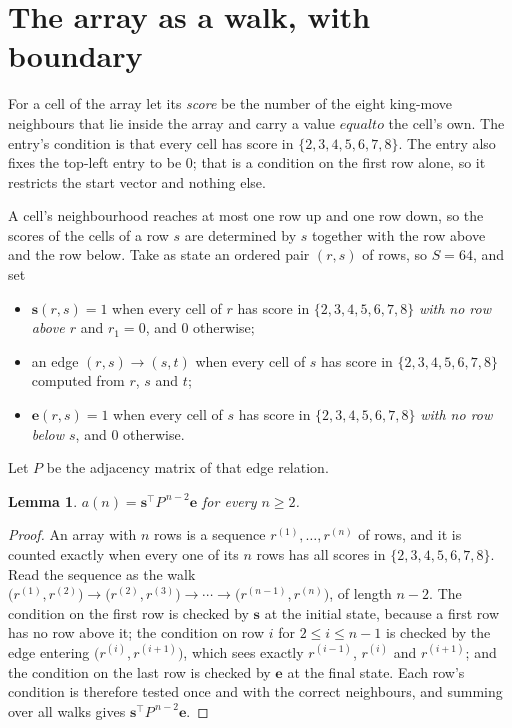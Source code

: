 \documentclass[11pt,a4paper]{article}
\theoremstyle{plain}
\newtheorem{lemma}[theorem]{Lemma}
\theoremstyle{definition}
\begin{document}
\section{The array as a walk, with boundary}

For a cell of the array let its \emph{score} be the number of the eight king-move neighbours that lie inside
the array and carry a value $equal to$ the cell's own. The entry's condition is that every cell
has score in $\{2,3,4,5,6,7,8\}$. The entry also fixes the top-left entry to be $0$; that is a condition on the first row alone, so it restricts the start vector and nothing else.

A cell's neighbourhood reaches at most one row up and one row down, so the scores of the
cells of a row $s$ are determined by $s$ together with the row above and the row below.
Take as state an ordered pair $(r,s)$ of rows, so $S=64$, and set
\begin{itemize}
\item $\mathbf{s}(r,s)=1$ when every cell of $r$ has score in $\{2,3,4,5,6,7,8\}$ \emph{with no row
above $r$} and $r_1=0$, and $0$ otherwise;
\item an edge $(r,s)\to(s,t)$ when every cell of $s$ has score in $\{2,3,4,5,6,7,8\}$ computed from
$r$, $s$ and $t$;
\item $\mathbf{e}(r,s)=1$ when every cell of $s$ has score in $\{2,3,4,5,6,7,8\}$ \emph{with no row
below $s$}, and $0$ otherwise.
\end{itemize}
Let $P$ be the adjacency matrix of that edge relation.

\begin{lemma}\label{lem:walk}
$a(n)=\mathbf{s}^{\!\top}P^{\,n-2}\mathbf{e}$ for every $n\ge2$.
\end{lemma}

\begin{proof}
An array with $n$ rows is a sequence $r^{(1)},\dots,r^{(n)}$ of rows, and it is counted
exactly when every one of its $n$ rows has all scores in $\{2,3,4,5,6,7,8\}$. Read the sequence as the
walk $\bigl(r^{(1)},r^{(2)}\bigr)\to\bigl(r^{(2)},r^{(3)}\bigr)\to\cdots\to
\bigl(r^{(n-1)},r^{(n)}\bigr)$, of length $n-2$. The condition on the first row is
checked by $\mathbf{s}$ at the initial state, because a first row has no row above it; the
condition on row $i$ for $2\le i\le n-1$ is checked by the edge entering
$\bigl(r^{(i)},r^{(i+1)}\bigr)$, which sees exactly $r^{(i-1)}$, $r^{(i)}$ and
$r^{(i+1)}$; and the condition on the last row is checked by $\mathbf{e}$ at the final
state. Each row's condition is therefore tested once and with the correct neighbours, and
summing over all walks gives $\mathbf{s}^{\!\top}P^{\,n-2}\mathbf{e}$.
\end{proof}
\end{document}
